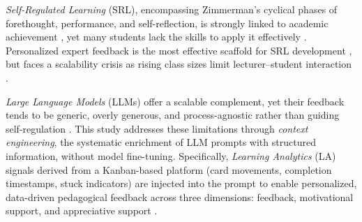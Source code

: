 \documentclass[conference,a4paper]{IEEEtran}
\begin{document}
%

\textit{Self-Regulated Learning} (SRL), encompassing
Zimmerman's cyclical phases of forethought, performance,
and self-reflection, is strongly linked to academic
achievement \cite{liu2025srl, zimmerman2009selfregulation},
yet many students lack the skills to apply it effectively
\cite{xiao2019relationships, chitra2022srl}. Personalized
expert feedback is the most effective scaffold for SRL
development \cite{10.3389/fpsyg.2022.1027266, Bock14032024},
but faces a scalability crisis as rising class sizes limit
lecturer--student interaction
\cite{schaffer2017automating, pardo2019using}.

\textit{Large Language Models} (LLMs) offer a scalable
complement, yet their feedback tends to be generic,
overly generous, and process-agnostic rather than
guiding self-regulation
\cite{Usher2025GenAIAssessments,
Maurya2025UnifyingAITutorEvaluation}. This study addresses
these limitations through \textit{context engineering}, the
systematic enrichment of LLM prompts with structured
information, without model fine-tuning. Specifically,
\textit{Learning Analytics} (LA) signals derived from a
Kanban-based platform (card movements, completion timestamps,
stuck indicators) are injected into the prompt to enable
personalized, data-driven pedagogical feedback across three
dimensions: feedback, motivational support,
and appreciative support
\cite{strickroth2022kanban, 10.3389/fpsyg.2022.1027266}.
\end{document}
